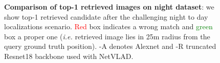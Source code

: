 \begin{figure}
	\caption[Comparison of top-1 retrieved images on night dataset]{\label{fig:night_im_exs} \textbf{Comparison of top-1 retrieved images on night dataset}: we show top-1 retrieved candidate after the challenging night to day localizations scenario. \textcolor{red}{Red} box indicates a wrong match and \textcolor{green}{green} box a proper one (\textit{i.e.} retrieved image lies in 25m radius from the query ground truth position). -A denotes Alexnet and -R truncated Resnet18 backbone used with NetVLAD.}
	
\end{figure}